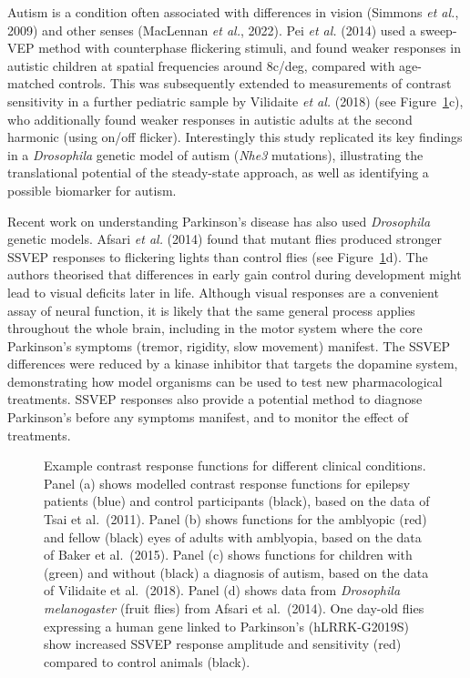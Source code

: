 \documentclass[
  letterpaper,
  DIV=11,
  numbers=noendperiod]{scrartcl}
\begin{document}
Autism is a condition often associated with differences in vision
(Simmons \emph{et al.}, 2009) and other senses (MacLennan \emph{et al.},
2022). Pei \emph{et al.} (2014) used a sweep-VEP method with
counterphase flickering stimuli, and found weaker responses in autistic
children at spatial frequencies around 8c/deg, compared with age-matched
controls. This was subsequently extended to measurements of contrast
sensitivity in a further pediatric sample by Vilidaite \emph{et al.}
(2018) (see Figure~\ref{fig-plotclinical}c), who additionally found
weaker responses in autistic adults at the second harmonic (using on/off
flicker). Interestingly this study replicated its key findings in a
\emph{Drosophila} genetic model of autism (\emph{Nhe3} mutations),
illustrating the translational potential of the steady-state approach,
as well as identifying a possible biomarker for autism.

Recent work on understanding Parkinson's disease has also used
\emph{Drosophila} genetic models. Afsari \emph{et al.} (2014) found that
mutant flies produced stronger SSVEP responses to flickering lights than
control flies (see Figure~\ref{fig-plotclinical}d). The authors
theorised that differences in early gain control during development
might lead to visual deficits later in life. Although visual responses
are a convenient assay of neural function, it is likely that the same
general process applies throughout the whole brain, including in the
motor system where the core Parkinson's symptoms (tremor, rigidity, slow
movement) manifest. The SSVEP differences were reduced by a kinase
inhibitor that targets the dopamine system, demonstrating how model
organisms can be used to test new pharmacological treatments. SSVEP
responses also provide a potential method to diagnose Parkinson's before
any symptoms manifest, and to monitor the effect of treatments.

\begin{figure}


\caption{\label{fig-plotclinical}Example contrast response functions for
different clinical conditions. Panel (a) shows modelled contrast
response functions for epilepsy patients (blue) and control participants
(black), based on the data of Tsai et al.~(2011). Panel (b) shows
functions for the amblyopic (red) and fellow (black) eyes of adults with
amblyopia, based on the data of Baker et al.~(2015). Panel (c) shows
functions for children with (green) and without (black) a diagnosis of
autism, based on the data of Vilidaite et al.~(2018). Panel (d) shows
data from \emph{Drosophila melanogaster} (fruit flies) from Afsari et
al.~(2014). One day-old flies expressing a human gene linked to
Parkinson's (hLRRK-G2019S) show increased SSVEP response amplitude and
sensitivity (red) compared to control animals (black).}

\end{figure}%
\end{document}
